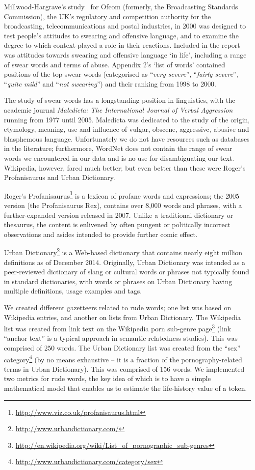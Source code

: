 \documentclass{AISB2008}
\begin{document}
Millwood-Hargrave's study~\cite{millwood-hargrave:2000} for Ofcom
(formerly, the Broadcasting Standards Commission), the UK's regulatory
and competition authority for the broadcasting, telecommunications and
postal industries, in 2000 was designed to test people's attitudes to
swearing and offensive language, and to examine the degree to which
context played a role in their reactions. Included in the report was
attitudes towards swearing and offensive language `in life', including
a range of swear words and terms of abuse. Appendix 2's `list of
words' contained positions of the top swear words (categorised as
``{\emph{very severe}}'', ``{\emph{fairly severe}}'', ``{\emph{quite
mild}}'' and ``{\emph{not swearing}}'') and their ranking from 1998 to
2000.

The study of swear words has a longstanding position in linguistics,
with the academic journal {\emph{Maledicta: The International Journal
of Verbal Aggression}} running from 1977 until 2005. Maledicta was
dedicated to the study of the origin, etymology, meaning, use and
influence of vulgar, obscene, aggressive, abusive and blasphemous
language. Unfortunately we do not have resources such as databases in
the literature; furthermore, WordNet does not contain the range of
swear words we encountered in our data and is no use for
disambiguating our text. Wikipedia, however, fared much better; but
even better than these were Roger's Profanisaurus and Urban
Dictionary.

Roger's
Profanisaurus\footnote{\url{http://www.viz.co.uk/profanisaurus.html}}
is a lexicon of profane words and expressions; the 2005 version (the
Profanisaurus Rex), contains over 8,000 words and phrases, with a
further-expanded version released in 2007. Unlike a traditional
dictionary or thesaurus, the content is enlivened by often pungent or
politically incorrect observations and asides intended to provide
further comic effect.

Urban Dictionary\footnote{\url{http://www.urbandictionary.com/}} is a
Web-based dictionary that contains nearly eight million definitions as
of December 2014. Originally, Urban Dictionary was intended as a
peer-reviewed dictionary of slang or cultural words or phrases not
typically found in standard dictionaries, with words or phrases on
Urban Dictionary having multiple definitions, usage examples and tags.

We created different gazetteers related to rude words; one list was
based on Wikipedia entries, and another on lists from Urban
Dictionary. The Wikipedia list was created from link text on the
Wikipedia porn sub-genre
page\footnote{\url{http://en.wikipedia.org/wiki/List_of_pornographic_sub-genres}}
(link ``anchor text'' is a typical approach in semantic relatedness
studies). This was comprised of 250 words. The Urban Dictionary list
was created from the ``sex''
category\footnote{\url{http://www.urbandictionary.com/category/sex}}
(by no means exhaustive -- it is a fraction of the pornography-related
terms in Urban Dictionary). This was comprised of 156 words. We
implemented two metrics for rude words, the key idea of which is to
have a simple mathematical model that enables us to estimate the
life-history value of a token.
\end{document}
